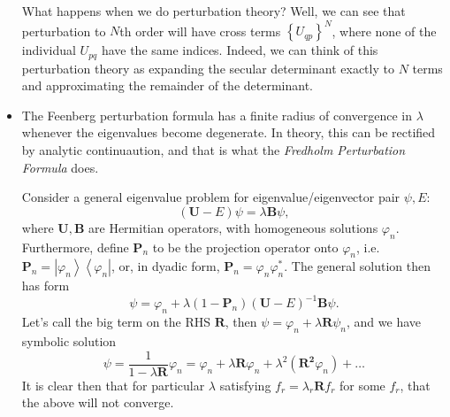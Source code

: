 \documentclass[11pt,
        usenames, %
        dvipsnames %
    ]{report}
\newcommand*{\bm}[1]{\boldsymbol{\mathbf{#1}}}
\newcommand*{\bra}[1]{\left<#1\right|}
\newcommand*{\ket}[1]{\left|#1\right>}
\newcommand*{\p}[1]{\left(#1\right)}
\newcommand*{\z}[1]{\left\{#1\right\}}
\begin{document}
\begin{itemize}
        What happens when we do perturbation theory? Well, we can see that
        perturbation to $N$th order will have cross terms $\z{U_{qp}}^N$, where
        none of the individual $U_{pq}$ have the same indices. Indeed, we can
        think of this perturbation theory as expanding the secular determinant
        exactly to $N$ terms and approximating the remainder of the determinant.

    \item The Feenberg perturbation formula has a finite radius of convergence
        in $\lambda$ whenever the eigenvalues become degenerate. In theory, this
        can be rectified by analytic continuaution, and that is what the
        \emph{Fredholm Perturbation Formula} does.

        Consider a general eigenvalue problem for eigenvalue/eigenvector pair
        $\psi, E$:
        \begin{equation}
            \p{\bm{U} - E}\psi = \lambda \bm{B} \psi,
        \end{equation}
        where $\bm{U}, \bm{B}$ are Hermitian operators, with homogeneous
        solutions $\varphi_n$. Furthermore, define $\bm{P}_n$ to be the
        projection operator onto $\varphi_n$, i.e.\ $\bm{P}_n =
        \ket{\varphi_n}\bra{\varphi_n}$, or, in dyadic form, $\bm{P}_n =
        \varphi_n\varphi_n^*$. The general solution then has form
        \begin{equation}
            \psi = \varphi_n + \lambda\p{1 - \bm{P}_n}\p{\bm{U} - E}^{-1}
                \bm{B} \psi.
        \end{equation}
        Let's call the big term on the RHS $\bm{R}$, then $\psi = \varphi_n +
        \lambda \bm{R} \psi_n$, and we have symbolic solution
        \begin{equation}
            \psi = \frac{1}{1 - \lambda \bm{R}}\varphi_n
                = \varphi_n + \lambda \bm{R}\varphi_n +
                \lambda^2\p{\bm{R^2}\varphi_n} + \dots
        \end{equation}
        It is clear then that for particular $\lambda$ satisfying $f_r =
        \lambda_r \bm{R}f_r$ for some $f_r$, that the above will not converge.


\end{itemize}
\end{document}
